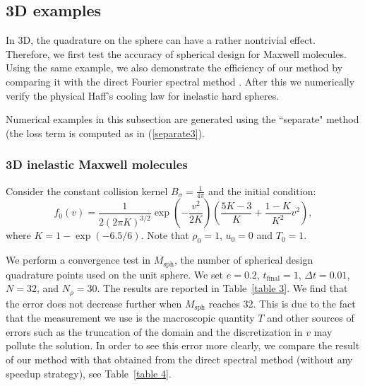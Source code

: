 \documentclass[review, times]{elsarticle}
\begin{document}
\subsection{3D examples}

In 3D, the quadrature on the sphere can have a rather nontrivial effect. Therefore, we first test the accuracy of spherical design for Maxwell molecules. Using the same example, we also demonstrate the efficiency of our method by comparing it with the direct Fourier spectral method \cite{FPT05}. After this we numerically verify the physical Haff's cooling law for inelastic hard spheres.

Numerical examples in this subsection are generated using the ``separate" method (the loss term is computed as in (\ref{separate3}).

\subsubsection{3D inelastic Maxwell molecules}

Consider the constant collision kernel $B_{\sigma} = \frac{1}{4\pi}$ and the initial condition:
\begin{equation}\label{3Dbkw}
  f_0(v) = \frac{1}{2(2\pi K)^{3/2}}\exp\left(-\frac{v^2}{2K}\right)\left(\frac{5K-3}{K}+\frac{1-K}{K^2}v^2\right),
\end{equation}
where $K = 1 - \exp(-6.5/6)$. Note that $\rho_0=1$, $u_0=0$ and $T_0=1$.

We perform a convergence test in $M_{\text{sph}}$, the number of spherical design quadrature points used on the unit sphere. We set $e=0.2$, $t_\text{final} = 1$, $\Delta t = 0.01$, $N = 32$, and $N_{\rho}=30$. The results are reported in Table~\ref{table 3}. We find that the error does not decrease further when $M_{\text{sph}}$ reaches $32$. This is due to the fact that the measurement we use is the macroscopic quantity $T$ and other sources of errors such as the truncation of the domain and the discretization in $v$ may pollute the solution. In order to see this error more clearly, we compare the result of our method with that obtained from the direct spectral method (without any speedup strategy), see Table~\ref{table 4}.
\end{document}

